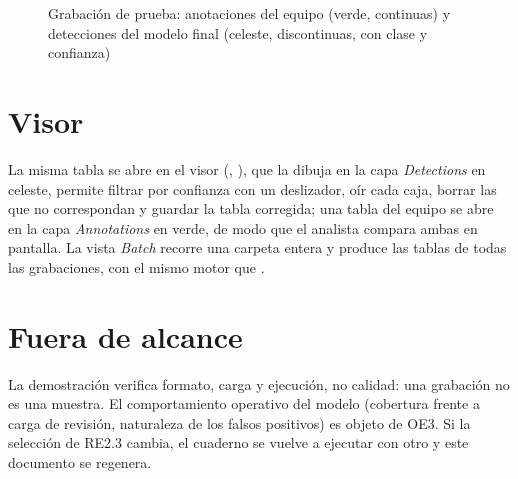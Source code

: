 \documentclass[12pt,a4paper]{article}
\begin{document}
\begin{figure}[htbp]
    \centering
    
    \caption{Grabación de prueba: anotaciones del equipo (verde, continuas) y detecciones del
        modelo final (celeste, discontinuas, con clase y confianza)}
    \label{fig:demo}
\end{figure}

\section{Visor}

La misma tabla se abre en el visor (, ), que la dibuja en
la capa \emph{Detections} en celeste, permite filtrar por confianza con un deslizador, oír cada
caja, borrar las que no correspondan y guardar la tabla corregida; una tabla del equipo se
abre en la capa \emph{Annotations} en verde, de modo que el analista compara ambas en
pantalla. La vista \emph{Batch} recorre una carpeta entera y produce las tablas de todas las
grabaciones, con el mismo motor que . 

\section{Fuera de alcance}

La demostración verifica formato, carga y ejecución, no calidad: una grabación no es una
muestra. El comportamiento operativo del modelo (cobertura frente a carga de revisión,
naturaleza de los falsos positivos) es objeto de OE3. Si la selección de RE2.3 cambia, el
cuaderno se vuelve a ejecutar con otro  y este documento se regenera.

\clearpage


\end{document}
